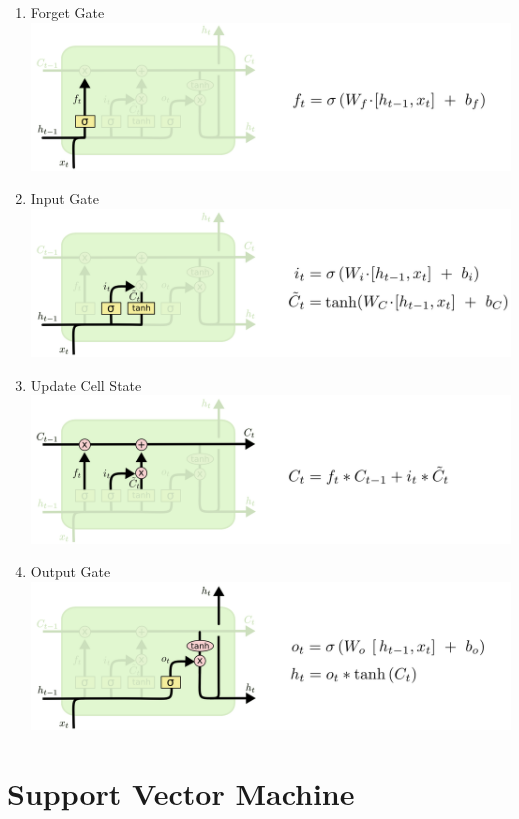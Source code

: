 \documentclass[11pt]{article}
\begin{document}
\begin{enumerate}
	\item Forget Gate \\ 
		\includegraphics[scale=0.5]{./images/LSTM3-focus-f.png}
\item Input Gate \\
 \includegraphics[scale=0.5]{./images/LSTM3-focus-i.png}
\item Update Cell State \\
		\includegraphics[scale=0.5]{./images/LSTM3-focus-C.png}
\item Output Gate	\\
\includegraphics[scale=0.5]{./images/LSTM3-focus-o.png}
\end{enumerate}
	
\section{Support Vector Machine}
\end{document}
